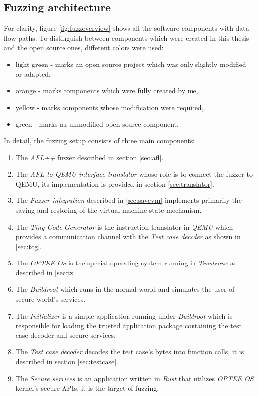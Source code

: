\subsection{Fuzzing architecture}
For clarity, figure \ref{fig:fuzzoverview} shows all the software components with data flow paths. To distinguish between components which were created in this thesis and the open source ones, different colors were used:
\begin{itemize}
    \item \colorbox{green!30}{light green} - marks an open source project which was only slightly modified or adapted,
    \item \colorbox{orange!30}{orange} - marks components which were fully created by me,
    \item \colorbox{yellow!30}{yellow} - marks components whose modification were required,
    \item \colorbox{green!60}{green} - marks an unmodified open source component.
\end{itemize}
In detail, the fuzzing setup consists of three main components:
\begin{enumerate}
    \item The \textit{AFL++} fuzzer described in section \ref{sec:afl}.
    \item The \textit{AFL to QEMU interface translator} whose role is to connect the fuzzer to QEMU, its implementation is provided in section \ref{sec:translator}.
    \item The \textit{Fuzzer integration} described in \ref{sec:savevm} implements primarily the saving and restoring of the virtual machine state mechanism.
    \item The \textit{Tiny Code Generator} is the instruction translator in \textit{QEMU} which provides a communication channel with the \textit{Test case decoder} as shown in \ref{sec:tcg}.
    \item The \textit{OPTEE OS} is the special operating system running in \textit{Trustzone} as described in \ref{sec:tz}.
    \item The \textit{Buildroot} which runs in the normal world and simulates the user of secure world's services.
    \item The \textit{Initializer} is a simple application running under \textit{Buildroot} which is responsible for loading the trusted application package containing the test case decoder and secure services.
    \item The \textit{Test case decoder} decodes the test case's bytes into function calls, it is described in section \ref{sec:testcase}.
    \item The \textit{Secure services} is an application written in \textit{Rust} that utilizes \textit{OPTEE OS} kernel's secure APIs, it is the target of fuzzing.
\end{enumerate}

